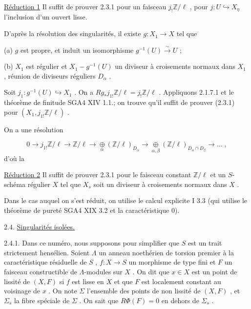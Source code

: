 \underline{Réduction 1}  Il suffit de prouver 2.3.1 pour un faisceau $j_{!} \mathbb{Z}/\ell$ , pour $j : U \hookrightarrow X_{\eta}$ l'inclusion d'un ouvert lisse.

D'après la résolution des singularités, il existe $g : X_{1} \to X$ tel que

(a)  $g$ est propre, et induit un isomorphisme $g^{-1}(U) \overset{\sim}{\longrightarrow} U$ ;

(b)  $X_{1}$ est régulier et $X_{1} - g^{-1}(U)$ un diviseur à croisements normaux dans $X_{1}$ , réunion de diviseurs réguliers $D_{\alpha}$ .

Soit $j_{1} : g^{-1}(U) \hookrightarrow X_{1}$ . On a $Rg_{*} j_{1!} \mathbb{Z}/\ell = j_{!} \mathbb{Z}/\ell$ . Appliquons 2.1.7.1 et le théorème de finitude SGA4 XIV 1.1.; on trouve qu'il suffit de prouver (2.3.1) pour $(X_{1}, j_{1!} \mathbb{Z}/\ell)$ .

On a une résolution

\begin{equation*}
0 \longrightarrow j_{1!}\mathbb{Z}/\ell \longrightarrow \mathbb{Z}/\ell \longrightarrow \underset{\alpha}{\oplus} (\mathbb{Z}/\ell)_{D_{\alpha}} \longrightarrow \underset{\alpha,\beta}{\oplus} (\mathbb{Z}/\ell)_{D_{\alpha} \cap D_{\beta}} \longrightarrow \ldots \; ,
\end{equation*}
d'où la

\underline{Réduction 2}  Il suffit de prouver 2.3.1 pour le faisceau constant $\mathbb{Z}/\ell$ et un $S$-schéma régulier $X$ tel que $X_{s}$ soit un diviseur à croisements normaux dans $X$ .

Dans le cas auquel on s'est réduit, on utilise le calcul explicite I 3.3 (qui utilise le théorème de pureté SGA4 XIX 3.2 et la caractéristique 0).


2.4.  \underline{Singularités isolées.}

2.4.1.  Dans ce numéro, nous supposons pour simplifier que $S$ est un trait strictement hensélien. Soient $\Lambda$ un anneau noethérien de torsion premier à la caractéristique résiduelle de $S$ , $f : X \to S$ un morphisme de type fini et $F$ un faisceau constructible de $\Lambda$-modules sur $X$ . On dit que $x \in X$ est un point de lissité de
$(X, F)$ si $f$ est lisse en $X$ et que $F$ est localement constant au voisinage de $x$ . On note $\Sigma$ l'ensemble des points de non lissité de $(X, F)$ , et $\Sigma_s$ la fibre spéciale de $\Sigma$ . On sait que $R\Phi(F) = 0$ en dehors de $\Sigma_s$ .


